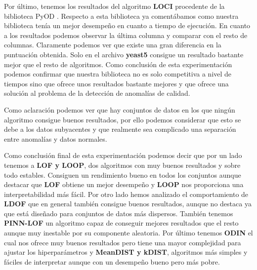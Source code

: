 Por último, tenemos los resultados del algoritmo \textbf{LOCI} procedente de la biblioteca PyOD \cite{zhaoPyODPythonToolbox2019}.
Respecto a esta biblioteca ya comentábamos como nuestra biblioteca tenía un mejor desempeño en cuanto a tiempo de ejecución.
En cuanto a los resultados podemos observar la última columna y comparar con el resto de columnas. Claramente podemos ver que existe
una gran diferencia en la puntuación obtenida. Solo en el archivo \textbf{yeast5} consigue un resultado bastante mejor que el resto de
algoritmos. Como conclusión de esta experimentación podemos confirmar que nuestra biblioteca no es solo competitiva a nivel de tiempos
sino que ofrece unos resultados bastante mejores y que ofrece una solución al problema de la detección de anomalías de calidad.

Como aclaración podemos ver que hay conjuntos de datos en los que ningún algoritmo consigue buenos resultados, por ello 
podemos considerar que esto se debe a los datos subyacentes y que realmente sea complicado una separación entre 
anomalías y datos normales. 

Como conclusión final de esta experimentación podemos decir que por un lado tenemos a \textbf{LOF y LOOP}, 
dos algoritmos con muy buenos resultados y sobre todo estables. Consiguen un rendimiento bueno  
en todos los conjuntos aunque destacar que \textbf{LOF} obtiene un mejor desempeño y \textbf{LOOP} nos 
proporciona una interpretabilidad más fácil. Por otro lado hemos analizado el comportamiento de \textbf{LDOF} 
que en general también consigue buenos resultados, aunque no destaca ya que está diseñado para conjuntos de datos 
más dispersos. También tenemos \textbf{PINN-LOF} un algoritmo capaz de conseguir mejores resultados que el resto aunque 
muy inestable por su componente aleatoria. Por último tenemos \textbf{ODIN} el cual nos ofrece muy buenos resultados
pero tiene una mayor complejidad para ajustar los hiperparámetros y \textbf{MeanDIST y kDIST}, algoritmos más simples y 
fáciles de interpretar aunque con un desempeño bueno pero más pobre.


